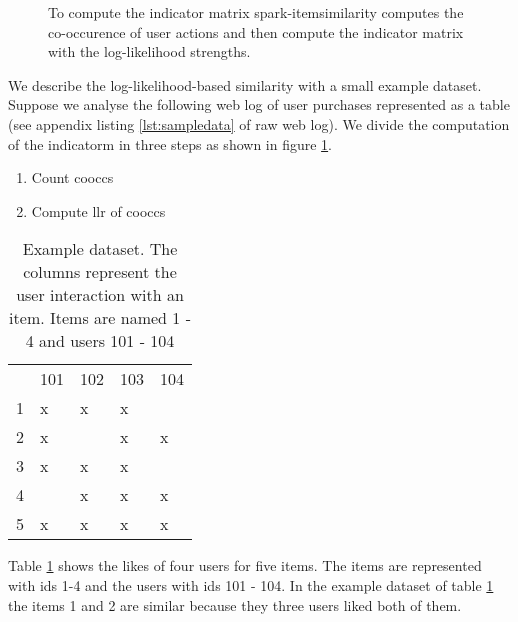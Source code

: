 \begin{figure}
\centering
{}
\caption{To compute the indicator matrix {\ttfamily spark-itemsimilarity} computes the co-occurence  of user actions and then compute the indicator matrix with the log-likelihood strengths.}
\label{fig:llrworkflow}
\end{figure}

We describe the log-likelihood-based similarity with a small example dataset. Suppose we analyse the following web log of user purchases represented as a table (see appendix listing \ref{lst:sampledata} of raw web log). We divide the computation of the \gls{indicatorm} in three steps as shown in figure \ref{fig:llrworkflow}.
\begin{enumerate}
\item Count \glspl{coocc}
\item Compute \gls{llr} of \glspl{coocc}
\end{enumerate}

\begin{table}
\begin{center}
\begin{tabular}{rllll}
 & 101 & 102 & 103 & 104\\
1 & x & x & x &  \\
2 & x &   & x & x\\
3 & x & x & x &  \\
4 &   & x & x & x\\
5 & x & x & x & x\\
\end{tabular}
\end{center}
\caption{Example dataset. The columns represent the user interaction with an item. Items are named 1 - 4 and users 101 - 104}
\label{tbl:llr}
\end{table}

Table \ref{tbl:llr} shows the likes of four users for five items. The items are represented with ids 1-4 and the users with ids 101 - 104.
In the example dataset of table \ref{tbl:llr} the items 1 and 2 are similar because they three users liked both of them.

